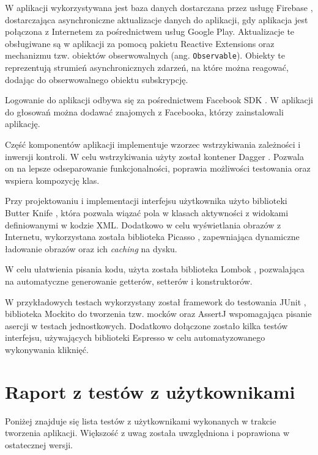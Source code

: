 \documentclass[10pt,a4paper]{article}
\begin{document}
W aplikacji wykorzystywana jest baza danych dostarczana przez usługę Firebase \cite{firebase},
dostarczająca asynchroniczne aktualizacje danych do aplikacji, gdy aplikacja jest połączona
z Internetem za pośrednictwem usług Google Play.
Aktualizacje te obsługiwane są w aplikacji za pomocą pakietu Reactive Extensions oraz mechanizmu
tzw. obiektów obserwowalnych (ang. \texttt{Observable}).
Obiekty te reprezentują strumień asynchronicznych zdarzeń, na które można reagować, dodając
do obserwowalnego obiektu subskrypcję.

Logowanie do aplikacji odbywa się za pośrednictwem Facebook SDK \cite{facebook-sdk}.
W aplikacji do głosowań można dodawać znajomych z Facebooka, którzy zainstalowali aplikację.

Część komponentów aplikacji implementuje wzorzec wstrzykiwania zależności i inwersji kontroli.
W celu wstrzykiwania użyty został kontener Dagger \cite{dagger}.
Pozwala on na lepsze odseparowanie funkcjonalności, poprawia możliwości testowania oraz wspiera
kompozycję klas.

Przy projektowaniu i implementacji interfejsu użytkownika użyto biblioteki Butter Knife
\cite{butterknife}, która pozwala wiązać pola w klasach aktywności z widokami definiowanymi
w kodzie XML.
Dodatkowo w celu wyświetlania obrazów z Internetu, wykorzystana została biblioteka Picasso
\cite{picasso}, zapewniająca dynamiczne ładowanie obrazów oraz ich \emph{caching} na dysku.

W celu ułatwienia pisania kodu, użyta została biblioteka Lombok \cite{lombok}, pozwalająca
na automatyczne generowanie getterów, setterów i konstruktorów.

W przykładowych testach wykorzystany został framework do testowania JUnit \cite{junit},
biblioteka Mockito \cite{mockito} do tworzenia tzw. mocków oraz AssertJ \cite{assertj} wspomagająca
pisanie asercji w testach jednostkowych.
Dodatkowo dołączone zostało kilka testów interfejsu, używających biblioteki Espresso \cite{espresso}
w celu automatyzowanego wykonywania kliknięć.

\section{Raport z testów z użytkownikami}

Poniżej znajduje się lista testów z użytkownikami wykonanych w trakcie tworzenia aplikacji. Większość
z uwag została uwzględniona i poprawiona w ostatecznej wersji.
\end{document}
